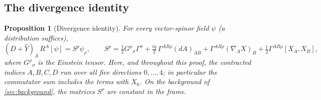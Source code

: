 \documentclass[11pt]{article}
\theoremstyle{plain}
\newtheorem{proposition}[theorem]{Proposition}
\theoremstyle{definition}
\theoremstyle{remark}
\begin{document}
\subsection{The divergence identity}\label{sec:di}

\begin{proposition}[Divergence identity]\label{prop:di}
For every vector-spinor field $\psi$ (a distribution suffices),
\begin{equation}\label{eq:di}
  (D+\hat Y)_A\, R^A[\psi] = S^\rho\psi_\rho,
  \qquad
  S^\rho = \tfrac12 G^{\rho}{}_{\sigma}\Gamma^\sigma + \tfrac{iq}{2}\,\Gamma^{AB\rho}(dA)_{AB} + \Gamma^{AB\rho}(\nabla_AX)_B + \tfrac12\Gamma^{AB\rho}[X_A,X_B],
\end{equation}
where $G^{\rho}{}_{\sigma}$ is the Einstein tensor. Here, and throughout this proof, the contracted indices $A,B,C,D$ run over all five directions $0,\dots,4$; in particular the commutator sum includes the terms with $X_0$. On the background of \cref{sec:background}, the matrices $S^\rho$ are constant in the frame.
\end{proposition}
\end{document}

